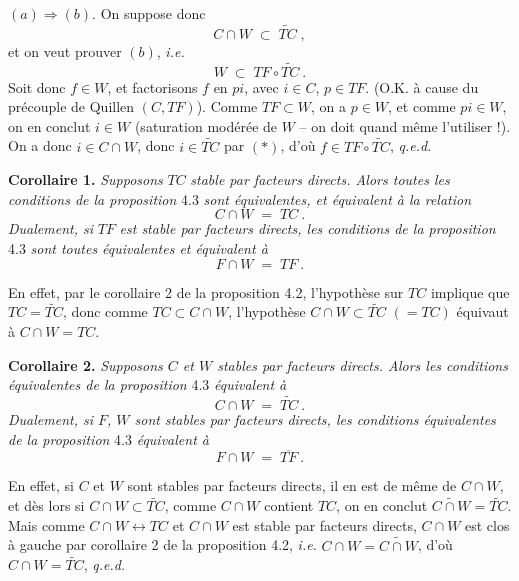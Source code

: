 \documentclass[11pt]{article}
\newcommand{\printedpage}[1]{\marginpar{\footnotesize p.~#1}}
\newcommand{\msp}[1]{\marginpar{\footnotesize [#1]}}
\begin{document}
$(a)\Longrightarrow(b)$. On suppose donc
\[
C\cap W \;\subset\; \widetilde{TC}\;,
\tag*{$(*)$}
\]
et on veut prouver $(b)$, \textit{i.e.}
\[
W \;\subset\; TF\circ\widetilde{TC}\ .
\]
Soit donc $f\in W$, et factorisons $f$ en $pi$, avec $i\in C$, $p\in TF$. (O.K. à cause du précouple de Quillen $(C,TF)$). Comme $TF\subset W$, on a $p\in W$, et comme $pi\in W$, on en conclut $i\in W$ (saturation modérée de $W$ -- on doit quand même l'utiliser !). On a donc $i\in C{\cap}W$, donc $i\in\widetilde{TC}$ par $(*)$, d'où $f\in TF\circ\widetilde{TC}$, \quad \textit{q.e.d.}

\textbf{Corollaire 1.} \textit{Supposons} $TC$ \textit{stable par facteurs directs. Alors toutes les conditions de la proposition} 4.3 \textit{sont équivalentes, et équivalent à la relation}
\[
C\cap W \;=\; TC\ .
\tag*{(4.3.4)}
\]
\textit{Dualement, si} $TF$ \textit{est stable par facteurs directs, les conditions de la proposition} 4.3 \textit{sont toutes équivalentes et équivalent à}
\[
F\cap W \;=\; TF\ .
\tag*{(4.3.4$'$)}
\]

\printedpage{24}

\msp{page 35}
En effet, par le corollaire 2 de la proposition 4.2, l'hypothèse sur $TC$ implique que $TC = \widetilde{TC}$, donc comme $TC \subset C{\cap}W$, l'hypothèse $C{\cap}W \subset \widetilde{TC}$ $(= TC)$ équivaut à $C{\cap}W = TC$.

\textbf{Corollaire 2.} \textit{Supposons $C$ et $W$ stables par facteurs directs. Alors les conditions équivalentes de la proposition} 4.3 \textit{équivalent à}
\[
C\cap W \;=\; \widetilde{TC}\ . \tag*{(4.3.5)}
\]
\textit{Dualement, si $F$, $W$ sont stables par facteurs directs, les conditions équivalentes de la proposition} 4.3 \textit{équivalent à}
\[
F\cap W \;=\; \overline{TF}\ . \tag*{(4.3.5$'$)}
\]

En effet, si $C$ et $W$ sont stables par facteurs directs, il en est de même de $C\cap W$, et dès lors si $C\cap W\subset\widetilde{TC}$, comme $C\cap W$ contient $TC$, on en conclut $\widetilde{C\cap W}=\widetilde{TC}$. Mais comme $C\cap W\longleftrightarrow TC$ et $C\cap W$ est stable par facteurs directs, $C\cap W$ est clos à gauche par corollaire 2 de la proposition 4.2, \textit{i.e.} $C\cap W=\widetilde{C\cap W}$, d'où $C\cap W=\widetilde{TC}$, \quad \textit{q.e.d.}
\end{document}
